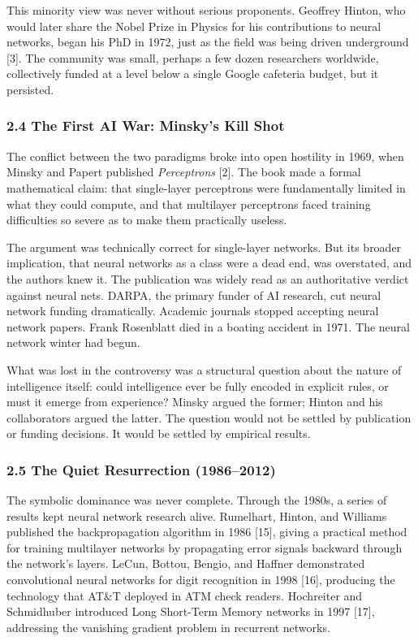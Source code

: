 \documentclass[
  11pt,
  letterpaper,
]{article}
\begin{document}
This minority view was never without serious proponents. Geoffrey
Hinton, who would later share the Nobel Prize in Physics for his
contributions to neural networks, began his PhD in 1972, just as the
field was being driven underground {[}3{]}. The community was small,
perhaps a few dozen researchers worldwide, collectively funded at a
level below a single Google cafeteria budget, but it persisted.

\subsubsection{2.4 The First AI War: Minsky's Kill
Shot}\label{the-first-ai-war-minskys-kill-shot}

The conflict between the two paradigms broke into open hostility in
1969, when Minsky and Papert published \emph{Perceptrons} {[}2{]}. The
book made a formal mathematical claim: that single-layer perceptrons
were fundamentally limited in what they could compute, and that
multilayer perceptrons faced training difficulties so severe as to make
them practically useless.

The argument was technically correct for single-layer networks. But its
broader implication, that neural networks as a class were a dead end,
was overstated, and the authors knew it. The publication was widely read
as an authoritative verdict against neural nets. DARPA, the primary
funder of AI research, cut neural network funding dramatically. Academic
journals stopped accepting neural network papers. Frank Rosenblatt died
in a boating accident in 1971. The neural network winter had begun.

What was lost in the controversy was a structural question about the
nature of intelligence itself: could intelligence ever be fully encoded
in explicit rules, or must it emerge from experience? Minsky argued the
former; Hinton and his collaborators argued the latter. The question
would not be settled by publication or funding decisions. It would be
settled by empirical results.

\subsubsection{2.5 The Quiet Resurrection
(1986--2012)}\label{the-quiet-resurrection-19862012}

The symbolic dominance was never complete. Through the 1980s, a series
of results kept neural network research alive. Rumelhart, Hinton, and
Williams published the backpropagation algorithm in 1986 {[}15{]},
giving a practical method for training multilayer networks by
propagating error signals backward through the network's layers. LeCun,
Bottou, Bengio, and Haffner demonstrated convolutional neural networks
for digit recognition in 1998 {[}16{]}, producing the technology that
AT\&T deployed in ATM check readers. Hochreiter and Schmidhuber
introduced Long Short-Term Memory networks in 1997 {[}17{]}, addressing
the vanishing gradient problem in recurrent networks.
\end{document}
